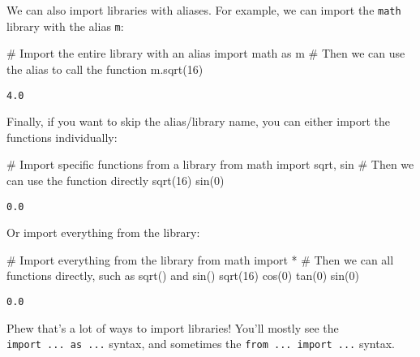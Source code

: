 \documentclass[
  letterpaper,
  DIV=11,
  numbers=noendperiod]{scrreprt}
\newenvironment{Shaded}{\begin{snugshade}}{\end{snugshade}}
\newcommand{\CommentTok}[1]{\textcolor[rgb]{0.37,0.37,0.37}{#1}}
\newcommand{\DecValTok}[1]{\textcolor[rgb]{0.68,0.00,0.00}{#1}}
\newcommand{\ImportTok}[1]{\textcolor[rgb]{0.00,0.46,0.62}{#1}}
\newcommand{\NormalTok}[1]{\textcolor[rgb]{0.00,0.23,0.31}{#1}}
\newcommand{\OperatorTok}[1]{\textcolor[rgb]{0.37,0.37,0.37}{#1}}
\begin{document}
We can also import libraries with aliases. For example, we can import
the \texttt{math} library with the alias \texttt{m}:

\begin{Shaded}
\begin{Highlighting}[]
\CommentTok{\# Import the entire library with an alias}
\ImportTok{import}\NormalTok{ math }\ImportTok{as}\NormalTok{ m}
\CommentTok{\# Then we can use the alias to call the function}
\NormalTok{m.sqrt(}\DecValTok{16}\NormalTok{)}
\end{Highlighting}
\end{Shaded}

\begin{verbatim}
4.0
\end{verbatim}

Finally, if you want to skip the alias/library name, you can either
import the functions individually:

\begin{Shaded}
\begin{Highlighting}[]
\CommentTok{\# Import specific functions from a library}
\ImportTok{from}\NormalTok{ math }\ImportTok{import}\NormalTok{ sqrt, sin}
\CommentTok{\# Then we can use the function directly}
\NormalTok{sqrt(}\DecValTok{16}\NormalTok{)}
\NormalTok{sin(}\DecValTok{0}\NormalTok{)}
\end{Highlighting}
\end{Shaded}

\begin{verbatim}
0.0
\end{verbatim}

Or import everything from the library:

\begin{Shaded}
\begin{Highlighting}[]
\CommentTok{\# Import everything from the library}
\ImportTok{from}\NormalTok{ math }\ImportTok{import} \OperatorTok{*}
\CommentTok{\# Then we can all functions directly, such as sqrt() and sin()}
\NormalTok{sqrt(}\DecValTok{16}\NormalTok{)}
\NormalTok{cos(}\DecValTok{0}\NormalTok{)}
\NormalTok{tan(}\DecValTok{0}\NormalTok{)}
\NormalTok{sin(}\DecValTok{0}\NormalTok{)}
\end{Highlighting}
\end{Shaded}

\begin{verbatim}
0.0
\end{verbatim}

Phew that's a lot of ways to import libraries! You'll mostly see the
\texttt{import\ ...\ as\ ...} syntax, and sometimes the
\texttt{from\ ...\ import\ ...} syntax.
\end{document}
